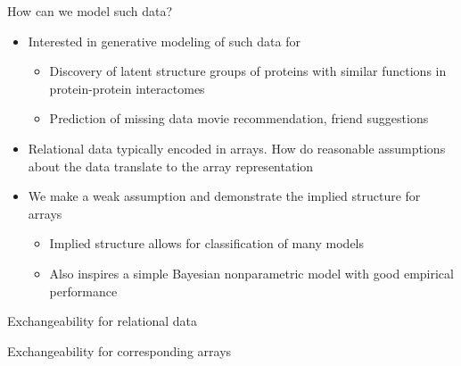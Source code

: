 \begin{frame}{How can we model such data?}
  \begin{block}{}
    \begin{itemize}
      \item Interested in generative modeling of such data for \eg
      \begin{itemize}
        \item Discovery of latent structure \eg groups of proteins with similar functions in protein-protein interactomes
        \item Prediction of missing data \eg movie recommendation, friend suggestions
      \end{itemize}
      \vspace{\baselineskip}
      \item Relational data typically encoded in arrays. How do reasonable assumptions about the data translate to the array representation
      \vspace{\baselineskip}
      \item We make a weak assumption and demonstrate the implied structure for arrays
      \begin{itemize}
        \item Implied structure allows for classification of many models
        \item Also inspires a simple Bayesian nonparametric model with good empirical performance
      \end{itemize}
    \end{itemize}
  \end{block}
\end{frame}

\begin{frame}{Exchangeability for relational data}
  \begin{block}{}
  \center
  
  \end{block}
\end{frame}

\begin{frame}{Exchangeability for corresponding arrays}
  \begin{block}{}
  \center
  
  \end{block}
\end{frame}

